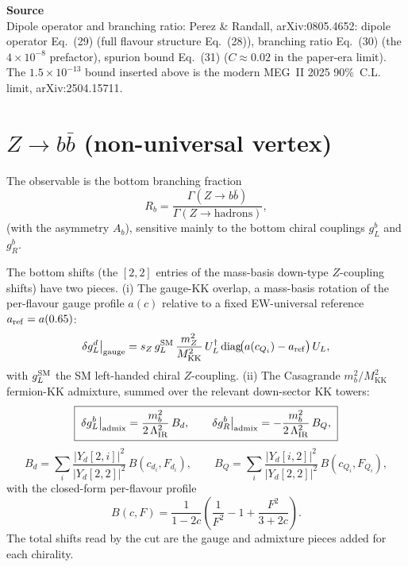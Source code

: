 \documentclass[11pt]{article}
\newcommand{\MKK}{M_{\mathrm{KK}}}
\newcommand{\LIR}{\Lambda_{\mathrm{IR}}}
\newenvironment{srcbox}{\begin{srcboxframe}\small\raggedright\sloppy}{\end{srcboxframe}}
\begin{document}
\begin{srcbox}
\textbf{Source}\\[2pt]
Dipole operator and branching ratio: Perez \& Randall,
arXiv:0805.4652: dipole operator Eq.~(29) (full flavour structure Eq.~(28)),
branching ratio Eq.~(30) (the $4\times10^{-8}$ prefactor), spurion bound Eq.~(31)
($C\approx0.02$ in the paper-era limit). The $1.5\times10^{-13}$ bound inserted
above is the modern MEG~II 2025 90\%~C.L. limit, arXiv:2504.15711.
\end{srcbox}

\bigskip
\section*{$Z\to b\bar b$ (non-universal vertex)}

\noindent The observable is the bottom branching fraction
\begin{equation}
R_b=\frac{\Gamma(Z\to b\bar b)}{\Gamma(Z\to\text{hadrons})},
\end{equation}
(with the asymmetry $A_b$), sensitive mainly to the bottom chiral couplings
$g_L^b$ and $g_R^b$.

\smallskip
\noindent The bottom shifts (the $[2,2]$ entries of the mass-basis down-type
$Z$-coupling shifts) have two pieces. (i) The gauge-KK overlap,
a mass-basis rotation of the per-flavour gauge profile $a(c)$ relative to a fixed
EW-universal reference $a_{\rm ref}=a(0.65)$:
\begin{equation}
\delta g_L^{d}\big|_{\rm gauge}
= s_Z\,g_L^{\rm SM}\,\frac{m_Z^2}{\MKK^2}\,
U_L^\dagger\,\mathrm{diag}\!\big(a(c_{Q_i})-a_{\rm ref}\big)\,U_L ,
\end{equation}
with $g_L^{\rm SM}$ the SM left-handed chiral $Z$-coupling. (ii) The Casagrande
$m_b^2/\MKK^2$ fermion-KK admixture, summed over the relevant down-sector KK
towers:
\begin{equation}
\boxed{\;
\delta g_L^{b}\big|_{\rm admix}=\frac{m_b^2}{2\,\LIR^2}\,B_d,
\qquad
\delta g_R^{b}\big|_{\rm admix}=-\frac{m_b^2}{2\,\LIR^2}\,B_Q,
\;}
\end{equation}
\begin{equation}
\boxed{\;
B_d=\sum_i\frac{|Y_d[2,i]|^2}{|Y_d[2,2]|^2}\,B(c_{d_i},F_{d_i}),
\qquad
B_Q=\sum_i\frac{|Y_d[i,2]|^2}{|Y_d[2,2]|^2}\,B(c_{Q_i},F_{Q_i}),
\;}
\end{equation}
with the closed-form per-flavour profile
\begin{equation}
\boxed{\;
B(c,F)=\frac{1}{1-2c}\left(\frac{1}{F^2}-1+\frac{F^2}{3+2c}\right).
\;}
\end{equation}
The total shifts read by the cut are the gauge and admixture pieces added for
each chirality.
\end{document}
